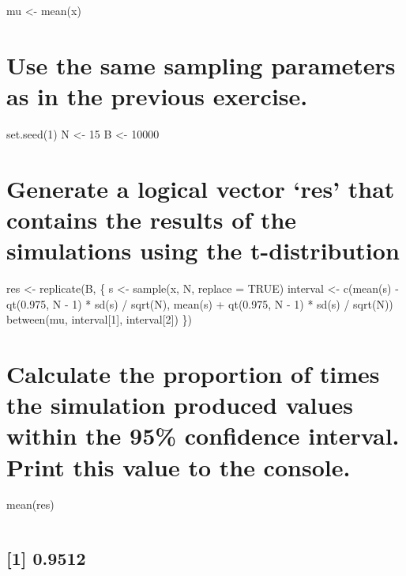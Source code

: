 \documentclass[
]{article}
\begin{document}
mu \textless- mean(x)

\hypertarget{use-the-same-sampling-parameters-as-in-the-previous-exercise.}{%
\section{Use the same sampling parameters as in the previous
exercise.}\label{use-the-same-sampling-parameters-as-in-the-previous-exercise.}}

set.seed(1) N \textless- 15 B \textless- 10000

\hypertarget{generate-a-logical-vector-res-that-contains-the-results-of-the-simulations-using-the-t-distribution}{%
\section{Generate a logical vector `res' that contains the results of
the simulations using the
t-distribution}\label{generate-a-logical-vector-res-that-contains-the-results-of-the-simulations-using-the-t-distribution}}

res \textless- replicate(B, \{ s \textless- sample(x, N, replace = TRUE)
interval \textless- c(mean(s) - qt(0.975, N - 1) * sd(s) / sqrt(N),
mean(s) + qt(0.975, N - 1) * sd(s) / sqrt(N)) between(mu,
interval{[}1{]}, interval{[}2{]}) \})

\hypertarget{calculate-the-proportion-of-times-the-simulation-produced-values-within-the-95-confidence-interval.-print-this-value-to-the-console.-1}{%
\section{Calculate the proportion of times the simulation produced
values within the 95\% confidence interval. Print this value to the
console.}\label{calculate-the-proportion-of-times-the-simulation-produced-values-within-the-95-confidence-interval.-print-this-value-to-the-console.-1}}

mean(res)

\begin{verbatim}
\end{verbatim}

\hypertarget{section-3}{%
\subsection{{[}1{]} 0.9512}\label{section-3}}
\end{document}
